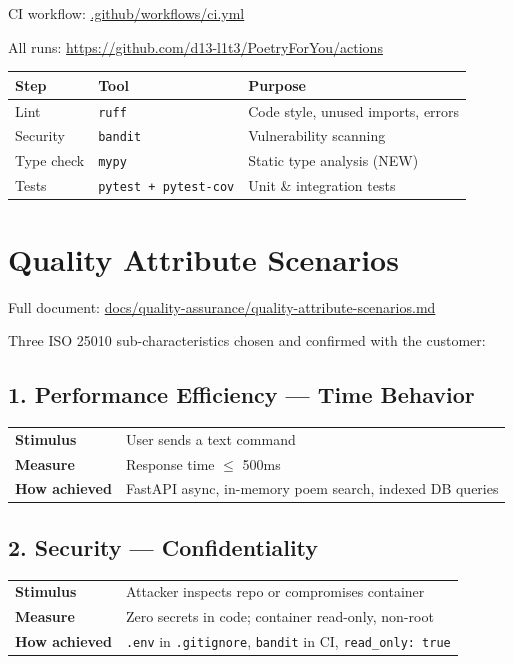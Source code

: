 \documentclass[11pt, a4paper]{article}
\begin{document}
CI workflow: \href{https://github.com/d13-l1t3/PoetryForYou/blob/main/.github/workflows/ci.yml}{.github/workflows/ci.yml}

All runs: \url{https://github.com/d13-l1t3/PoetryForYou/actions}

\begin{longtable}{lll}
\toprule
\textbf{Step} & \textbf{Tool} & \textbf{Purpose} \\
\midrule
Lint & \texttt{ruff} & Code style, unused imports, errors \\
Security & \texttt{bandit} & Vulnerability scanning \\
Type check & \texttt{mypy} & Static type analysis (NEW) \\
Tests & \texttt{pytest + pytest-cov} & Unit \& integration tests \\
\bottomrule
\end{longtable}

\section{Quality Attribute Scenarios}

Full document: \href{https://github.com/d13-l1t3/PoetryForYou/blob/main/docs/quality-assurance/quality-attribute-scenarios.md}{docs/quality-assurance/quality-attribute-scenarios.md}

Three ISO 25010 sub-characteristics chosen and confirmed with the customer:

\subsection*{1. Performance Efficiency --- Time Behavior}

\begin{tabularx}{\textwidth}{lX}
\toprule
\textbf{Stimulus} & User sends a text command \\
\textbf{Measure} & Response time $\leq$ 500ms \\
\textbf{How achieved} & FastAPI async, in-memory poem search, indexed DB queries \\
\bottomrule
\end{tabularx}

\subsection*{2. Security --- Confidentiality}

\begin{tabularx}{\textwidth}{lX}
\toprule
\textbf{Stimulus} & Attacker inspects repo or compromises container \\
\textbf{Measure} & Zero secrets in code; container read-only, non-root \\
\textbf{How achieved} & \texttt{.env} in \texttt{.gitignore}, \texttt{bandit} in CI, \texttt{read\_only: true} \\
\bottomrule
\end{tabularx}
\end{document}
